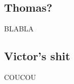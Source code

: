 \subsection {Thomas?}

\begin{frame}{BLABLA}
\end{frame}

\subsection{Victor's shit}

\begin{frame}{COUCOU}
\end{frame}
